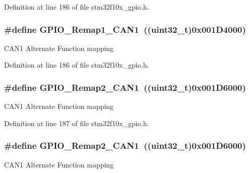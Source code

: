 Definition at line 186 of file stm32f10x\+\_\+gpio.\+h.

\subsubsection[{\texorpdfstring{G\+P\+I\+O\+\_\+\+Remap1\+\_\+\+C\+A\+N1}{GPIO_Remap1_CAN1}}]{\setlength{\rightskip}{0pt plus 5cm}\#define G\+P\+I\+O\+\_\+\+Remap1\+\_\+\+C\+A\+N1~(({\bf uint32\+\_\+t})0x001\+D4000)}\hypertarget{group___g_p_i_o___remap__define_ga89ac81224968d8faf42475be664c1e09}{}\label{group___g_p_i_o___remap__define_ga89ac81224968d8faf42475be664c1e09}
C\+A\+N1 Alternate Function mapping 

Definition at line 186 of file stm32f10x\+\_\+gpio.\+h.

\subsubsection[{\texorpdfstring{G\+P\+I\+O\+\_\+\+Remap2\+\_\+\+C\+A\+N1}{GPIO_Remap2_CAN1}}]{\setlength{\rightskip}{0pt plus 5cm}\#define G\+P\+I\+O\+\_\+\+Remap2\+\_\+\+C\+A\+N1~(({\bf uint32\+\_\+t})0x001\+D6000)}\hypertarget{group___g_p_i_o___remap__define_gad4f5b46cf24bed1563b22e6ecca3ebef}{}\label{group___g_p_i_o___remap__define_gad4f5b46cf24bed1563b22e6ecca3ebef}
C\+A\+N1 Alternate Function mapping 

Definition at line 187 of file stm32f10x\+\_\+gpio.\+h.

\subsubsection[{\texorpdfstring{G\+P\+I\+O\+\_\+\+Remap2\+\_\+\+C\+A\+N1}{GPIO_Remap2_CAN1}}]{\setlength{\rightskip}{0pt plus 5cm}\#define G\+P\+I\+O\+\_\+\+Remap2\+\_\+\+C\+A\+N1~(({\bf uint32\+\_\+t})0x001\+D6000)}\hypertarget{group___g_p_i_o___remap__define_gad4f5b46cf24bed1563b22e6ecca3ebef}{}\label{group___g_p_i_o___remap__define_gad4f5b46cf24bed1563b22e6ecca3ebef}
C\+A\+N1 Alternate Function mapping 

